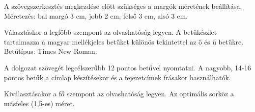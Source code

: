\documentclass[magyar,12pt,oneside]{article}
\begin{document}
\begin{description}[style=nextline]
\item[Margó]
A szövegszerkesztés megkezdése előtt szükséges a margók méretének beállítása. Méretezés: bal margó 3 cm, jobb 2 cm, felső 3 cm, alsó 3 cm.
\item[Betűtípus]
Választáskor a legfőbb szempont az olvashatóság legyen. A betűkészlet tartalmazza a magyar mellékjeles betűket különös tekintettel az ő és ű betűkre. Betűtípus: Times New Roman.
\item[Betűméret]
A dolgozat szövegét legcélszerűbb 12 pontos betűvel nyomtatni. A nagyobb, 14-16 pontos betűk a címlap készítésekor és a fejezetcímek írásakor használhatók.
\item[Sortávolság]
Kiválasztásakor a fő szempont az olvashatóság legyen. Az optimális sorköz a másfeles (1,5-es) méret.
\end{description}
\end{document}
